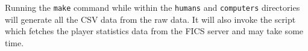 \documentclass{article}
\begin{document}
Running the \verb=make= command while within the \verb=humans= and \verb=computers= directories will generate all the CSV data from the raw data. It will also invoke the script which fetches the player statistics data from the FICS server and may take some time.\\

\pagebreak


\end{document}
